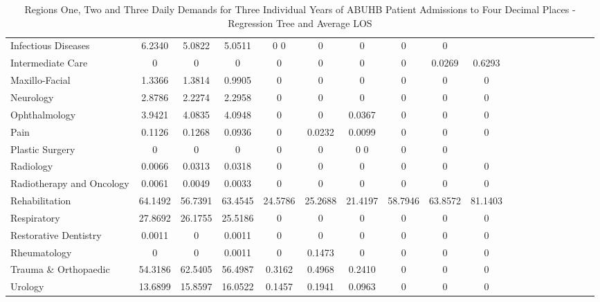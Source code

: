 \documentclass[thesis.tex]{subfiles}
\begin{document}
\begin{landscape}
\begin{table}[h!]
{\begin{tabular}{lcccccccccccccccccc}
Infectious Diseases&	6.2340&	5.0822&	5.0511	&0	0&	0&	0&	0&	0\\
Intermediate Care&	0&	0&	0&	0&	0&	0&	0&	0.0269&	0.6293\\
Maxillo-Facial&	1.3366	&1.3814&	0.9905	&0&	0&	0&	0&	0&	0\\
Neurology&	2.8786	&2.2274&	2.2958&	0&	0&	0&	0&	0&	0\\
Ophthalmology&	3.9421	&4.0835&	4.0948&	0&	0&0.0367&	0&	0&	0\\
Pain&	0.1126	&0.1268&	0.0936	&0&0.0232&	0.0099&	0&	0&0\\
Plastic Surgery&	0&	0&	0&	0&	0&0	0&	0&	0\\
Radiology	&0.0066	&0.0313	&0.0318&	0&	0&	0&	0&	0&	0\\
Radiotherapy and Oncology	&0.0061	&0.0049	&0.0033&	0&0&	0&	0&	0&	0\\
Rehabilitation	&64.1492&	56.7391&63.4545	&24.5786&	25.2688	&21.4197&	58.7946&	63.8572	&81.1403\\
Respiratory	&27.8692&	26.1755&	25.5186&	0&	0&	0&	0&	0&	0\\
Restorative Dentistry&	0.0011&	0&	0.0011	&0&	0&	0&	0&	0&	0\\
Rheumatology&	0&	0&	0.0011	&0&	0.1473&	0&	0&	0&	0\\
Trauma \& Orthopaedic	&54.3186	&62.5405	&56.4987	&0.3162	&0.4968	&0.2410&	0&	0&	0\\
Urology&	13.6899&	15.8597&	16.0522&0.1457	&0.1941	&0.0963&	0&	0&	0\\\bottomrule
\end{tabular}  } 
\caption{Regions One, Two and Three Daily Demands for Three Individual Years of ABUHB Patient Admissions to Four Decimal Places - Regression Tree and Average LOS}
    \label{apptab:LinkedDemands2a}
\end{table}

\begin{table}[h!]
    \centering{}
\end{table}
\end{landscape}
\end{document}
